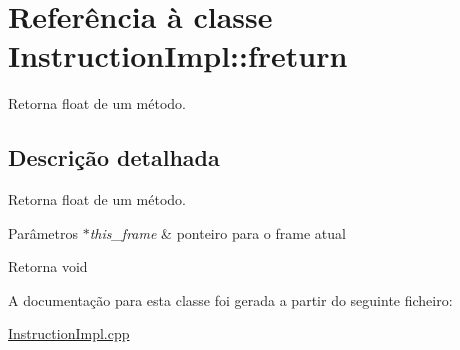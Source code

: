 \hypertarget{class_instruction_impl_1_1freturn}{}\section{Referência à classe Instruction\+Impl\+:\+:freturn}
\label{class_instruction_impl_1_1freturn}


Retorna float de um método.  




\subsection{Descrição detalhada}
Retorna float de um método. 


\begin{DoxyParams}{Parâmetros}
{\em $\ast$this\+\_\+frame} & ponteiro para o frame atual \\
\hline
\end{DoxyParams}
\begin{DoxyReturn}{Retorna}
void 
\end{DoxyReturn}


A documentação para esta classe foi gerada a partir do seguinte ficheiro\+:\begin{DoxyCompactItemize}
\item 
\hyperlink{_instruction_impl_8cpp}{Instruction\+Impl.\+cpp}\end{DoxyCompactItemize}
